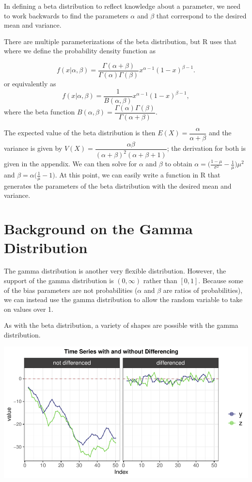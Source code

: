 \documentclass[12pt,twoside]{smiththesis}
\begin{document}
In defining a beta distribution to reflect knowledge about a parameter, we need to work backwards to find the parameters \(\alpha\) and \(\beta\) that correspond to the desired mean and variance.

There are multiple parameterizations of the beta distribution, but R uses that where we define the probability density function as

\[
f(x|\alpha,\beta) = \dfrac{\Gamma(\alpha + \beta)}{\Gamma(\alpha) \Gamma(\beta)} x^{\alpha - 1} (1-x)^{\beta - 1}.
\]
or equivalently as
\[
f(x|\alpha,\beta) = \dfrac{1}{B(\alpha,\beta)} x^{\alpha - 1} (1-x)^{\beta - 1},
\]
where the beta function \(B(\alpha, \beta) = \dfrac{\Gamma(\alpha)\Gamma(\beta) }{\Gamma ( \alpha + \beta)}\).

The expected value of the beta distribution is then \(E(X) = \dfrac{\alpha}{\alpha + \beta}\) and the variance is given by \(V(X) = \dfrac{\alpha \beta}{(\alpha + \beta)^2(\alpha + \beta + 1)}\); the derivation for both is given in the appendix. We can then solve for \(\alpha\) and \(\beta\) to obtain \(\alpha = \Big(\frac{1-\mu}{\sigma^2} - \frac{1}{\mu}\Big) \mu^2\) and \(\beta = \alpha\Big(\frac{1}{\mu} - 1\Big)\). At this point, we can easily write a function in R that generates the parameters of the beta distribution with the desired mean and variance.

\hypertarget{background-on-the-gamma-distribution}{%
\section{Background on the Gamma Distribution}\label{background-on-the-gamma-distribution}}

The gamma distribution is another very flexible distribution. However, the support of the gamma distribution is \((0,\infty)\) rather than \([0,1]\). Because some of the bias parameters are not probabilities (\(\alpha\) and \(\beta\) are ratios of probabilities), we can instead use the gamma distribution to allow the random variable to take on values over 1.

As with the beta distribution, a variety of shapes are possible with the gamma distribution.

\includegraphics[width=0.8\linewidth]{thesis_files/figure-latex/unnamed-chunk-26-1}
\end{document}
